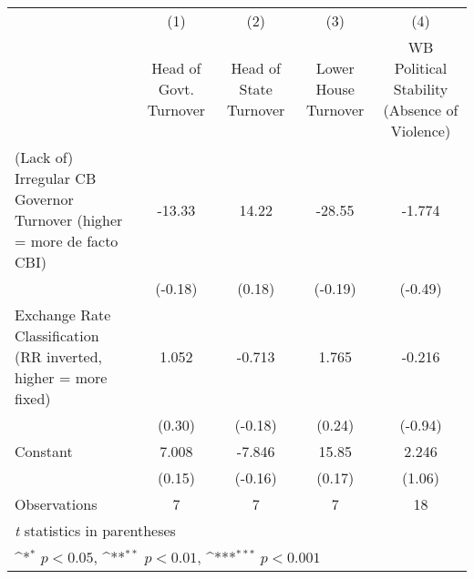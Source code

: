 {
\def\sym#1{\ifmmode^{#1}\else\(^{#1}\)\fi}
\begin{tabular}{l*{4}{c}}
\hline\hline
                &\multicolumn{1}{c}{(1)}&\multicolumn{1}{c}{(2)}&\multicolumn{1}{c}{(3)}&\multicolumn{1}{c}{(4)}\\
                &\multicolumn{1}{c}{Head of Govt. Turnover}&\multicolumn{1}{c}{Head of State Turnover}&\multicolumn{1}{c}{Lower House Turnover}&\multicolumn{1}{c}{WB Political Stability (Absence of Violence)}\\
\hline
(Lack of) Irregular CB Governor Turnover (higher = more de facto CBI)&   -13.33         &    14.22         &   -28.55         &   -1.774         \\
                &  (-0.18)         &   (0.18)         &  (-0.19)         &  (-0.49)         \\
[1em]
Exchange Rate Classification (RR inverted, higher = more fixed)&    1.052         &   -0.713         &    1.765         &   -0.216         \\
                &   (0.30)         &  (-0.18)         &   (0.24)         &  (-0.94)         \\
[1em]
Constant        &    7.008         &   -7.846         &    15.85         &    2.246         \\
                &   (0.15)         &  (-0.16)         &   (0.17)         &   (1.06)         \\
\hline
Observations    &        7         &        7         &        7         &       18         \\
\hline\hline
\multicolumn{5}{l}{\footnotesize \textit{t} statistics in parentheses}\\
\multicolumn{5}{l}{\footnotesize \sym{*} \(p<0.05\), \sym{**} \(p<0.01\), \sym{***} \(p<0.001\)}\\
\end{tabular}
}
